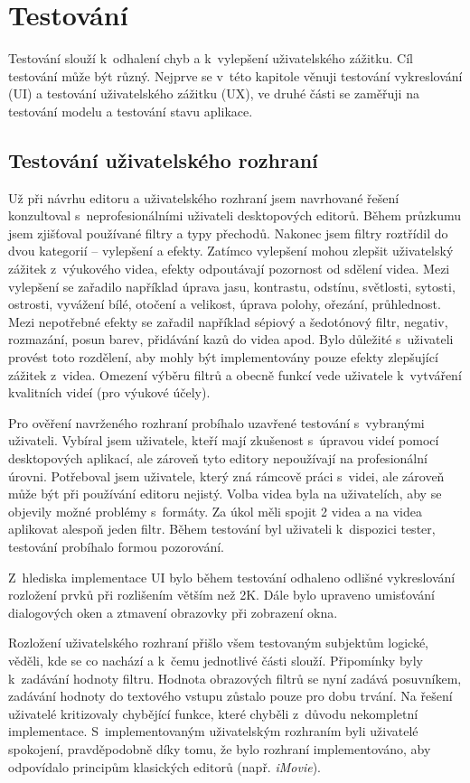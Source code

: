 \chapter{Testování}
Testování slouží k~odhalení chyb a k~vylepšení uživatelského zážitku. Cíl testování může být různý. Nejprve se v~této kapitole věnuji testování vykreslování (UI) a testování uživatelského zážitku (UX), ve druhé části se zaměřuji na testování modelu a testování stavu aplikace.

\section{Testování uživatelského rozhraní}
Už při návrhu editoru a uživatelského rozhraní jsem navrhované řešení konzultoval s~neprofesionálními uživateli desktopových editorů. Během průzkumu jsem zjišťoval používané filtry a typy přechodů. Nakonec jsem filtry roztřídil do dvou kategorií -- vylepšení a efekty. Zatímco vylepšení mohou zlepšit uživatelský zážitek z~výukového videa, efekty odpoutávají pozornost od sdělení videa. Mezi vylepšení se zařadilo například úprava jasu, kontrastu, odstínu, světlosti, sytosti, ostrosti, vyvážení bílé, otočení a velikost, úprava polohy, ořezání, průhlednost. Mezi nepotřebné efekty se zařadil například sépiový a šedotónový filtr, negativ, rozmazání, posun barev, přidávání kazů do videa apod. Bylo důležité s~uživateli provést toto rozdělení, aby mohly být implementovány pouze efekty zlepšující zážitek z~videa. Omezení výběru filtrů a obecně funkcí vede uživatele k~vytváření kvalitních videí (pro výukové účely).

Pro ověření navrženého rozhraní probíhalo uzavřené testování s~vybranými uživateli. Vybíral jsem uživatele, kteří mají zkušenost s~úpravou videí pomocí desktopových aplikací, ale zároveň tyto editory nepoužívají na profesionální úrovni. Potřeboval jsem uživatele, který zná rámcově práci s~videi, ale zároveň může být při používání editoru nejistý. Volba videa byla na uživatelích, aby se objevily možné problémy s~formáty. Za úkol měli spojit 2 videa a na videa aplikovat alespoň jeden filtr. Během testování byl uživateli k~dispozici tester, testování probíhalo formou pozorování.

Z~hlediska implementace UI bylo během testování odhaleno odlišné vykreslování rozložení prvků při rozlišením větším než 2K. Dále bylo upraveno umisťování dialogových oken a ztmavení obrazovky při zobrazení okna.

Rozložení uživatelského rozhraní přišlo všem testovaným subjektům logické, věděli, kde se co nachází a k~čemu jednotlivé části slouží. Připomínky byly k~zadávání hodnoty filtru. Hodnota obrazových filtrů se nyní zadává posuvníkem, zadávání hodnoty do textového vstupu zůstalo pouze pro dobu trvání. Na řešení uživatelé kritizovaly chybějící funkce, které chyběli z~důvodu nekompletní implementace. S~implementovaným uživatelským rozhraním byli uživatelé spokojení, pravděpodobně díky tomu, že bylo rozhraní implementováno, aby odpovídalo principům klasických editorů (např. \textit{iMovie}).

